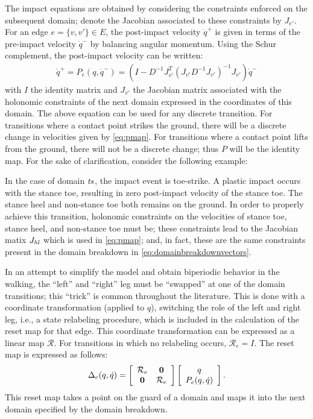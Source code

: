 The impact equations are obtained by considering the constraints enforced on the subsequent domain; denote the  Jacobian associated to these constraints by $J_{e'}$. For an edge $e = \{v, v'\} \in E$, the post-impact velocity ${\dot q}^+$ is given in terms of the pre-impact velocity ${\dot q}^-$ by balancing angular momentum.\cite{HM94}\xspace Using the Schur complement,\cite{Fuzhen05}\xspace the post-impact velocity can be written:
\begin{align}
  \label{eq:pmap}
  \dot{q}^{+} = P_{e}(q, {\dot q}^{-}) = (I - D^{-1} J_{v'}^T(J_{v'}D^{-1} J_{v'})^{-1} J_{v'}){\dot q}^{-}
\end{align}
with $I$ the identity matrix and $J_{v'}$ the Jacobian matrix associated with the holonomic constraints of the next domain expressed in the coordinates of this domain. The above equation can be used for any discrete transition. For transitions where a contact point strikes the ground, there will be a discrete change in velocities given by \eqref{eq:pmap}. For transitions where a contact point lifts from the ground, there will not be a discrete change; thus $P$ will be the identity map. For the sake of clarification, consider the following example:
\begin{exmp}
  In the case of domain $\mathit{ts}$, the impact event is toe-strike. A plastic impact occurs with the stance toe, resulting in zero post-impact velocity of the stance toe. The stance heel and non-stance toe both remains on the ground. In order to properly achieve this transition, holonomic constraints on the velocities of stance toe, stance heel, and non-stance toe must be; these constraints lead to the Jacobian matix $J_{\mathit{hl}}$ which is used in \eqref{eq:pmap}; and, in fact, these are the same constraints present in the domain breakdown in \eqref{eq:domainbreakdownvectors}.
\end{exmp}

In an attempt to simplify the model and obtain biperiodic behavior in the walking, the ``left'' and ``right'' leg must be ``swapped'' at one of the domain transitions; this ``trick'' is common throughout the literature.\cite{GAP01}\xspace This is done with a coordinate transformation (applied to $q$), switching the role of the left and right leg, i.e., a state relabeling procedure, which is included in the calculation of the reset map for that edge. This coordinate transformation can be expressed as a linear map $\mathcal{R}$. For transitions in which no relabeling occurs, $\mathcal{R}_{e} = I$. The reset map is expressed as follows:
\begin{align}
  \Delta_{e}(q, {\dot q}) =
  \left[ \begin{array}{c c}
      \mathcal{R}_{e} & {\mathbf 0}\\
      {\mathbf 0} & \mathcal{R}_{e}
    \end{array} \right]
  \left[ \begin{array}{c}
      q\\
      P_{e}(q, {\dot q})
    \end{array} \right].
\end{align}
This reset map takes a point on the guard of a domain and maps it into the next domain specified by the domain breakdown.

